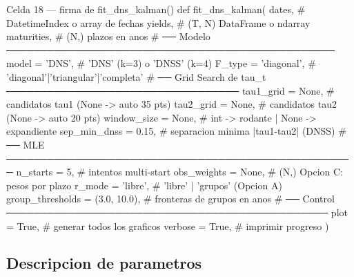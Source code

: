 \documentclass[12pt, a4paper]{article}
\theoremstyle{plain}
\theoremstyle{definition}
\theoremstyle{remark}
\begin{document}
\begin{codigocaja}{Celda 18 --- firma de fit\_dns\_kalman()}
def fit_dns_kalman(
    dates,                          # DatetimeIndex o array de fechas
    yields,                         # (T, N) DataFrame o ndarray
    maturities,                     # (N,) plazos en anos
    # ── Modelo ────────────────────────────────────────────────
    model            = 'DNS',       # 'DNS' (k=3) o 'DNSS' (k=4)
    F_type           = 'diagonal',  # 'diagonal'|'triangular'|'completa'
    # ── Grid Search de tau_t ──────────────────────────────────
    tau1_grid        = None,        # candidatos tau1 (None -> auto 35 pts)
    tau2_grid        = None,        # candidatos tau2 (None -> auto 20 pts)
    window_size      = None,        # int -> rodante | None -> expandiente
    sep_min_dnss     = 0.15,        # separacion minima |tau1-tau2| (DNSS)
    # ── MLE ───────────────────────────────────────────────────
    n_starts         = 5,           # intentos multi-start
    obs_weights      = None,        # (N,) Opcion C: pesos por plazo
    r_mode           = 'libre',     # 'libre' | 'grupos' (Opcion A)
    group_thresholds = (3.0, 10.0), # fronteras de grupos en anos
    # ── Control ───────────────────────────────────────────────
    plot    = True,                 # generar todos los graficos
    verbose = True,                 # imprimir progreso
)
\end{codigocaja}

\subsection{Descripcion de parametros}
\end{document}
